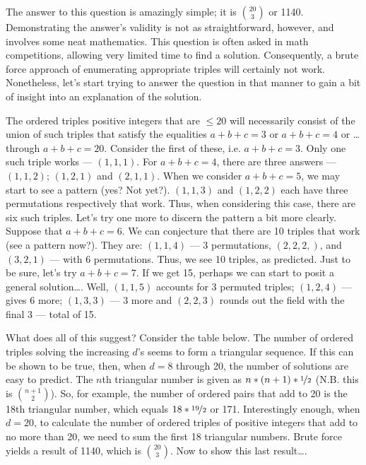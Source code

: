 
{}

The answer to this question is amazingly simple; it is \(\binom{20}{3}\) or 1140. Demonstrating the answer’s validity is not as straightforward, however, and involves some neat mathematics. This question is often asked in math competitions, allowing very limited time to find a solution. Consequently, a brute force approach of enumerating appropriate triples will certainly not work. Nonetheless, let’s start trying to answer the question in that manner to gain a bit of insight into an explanation of the solution.

The ordered triples positive integers that are \(\leq 20\) will necessarily consist of the union of such triples that satisfy the equalities \(a + b + c = 3\) or \(a + b + c = 4\) or \ldots through \(a + b + c = 20\). Consider the first of these, i.e. \(a + b + c = 3\). Only one such triple works --- \((1,1,1)\).  For \(a + b + c = 4\), there are three answers --- \((1,1,2)\); \((1,2,1)\) and \((2,1,1)\). When we consider \(a + b + c = 5\), we may start to see a pattern (yes? Not yet?). \((1,1,3)\) and \((1,2,2)\) each have three permutations respectively that work. Thus, when considering this case, there are six such triples. Let’s try one more to discern the pattern a bit more clearly. Suppose that \(a + b + c = 6\). We can conjecture that there are 10 triples that work (see a pattern now?). They are: \((1,1,4)\) --- 3 permutations, \((2,2,2,)\), and \((3,2,1)\) --- with 6 permutations. Thus, we see 10 triples, as predicted. Just to be sure, let’s try \(a + b + c = 7\). If we get 15, perhaps we can start to posit a general solution\ldots. Well, \((1,1,5)\) accounts for 3 permuted triples; \((1,2,4)\) --- gives 6 more; \((1,3,3)\) --- 3 more and \((2,2,3)\) rounds out the field with the final 3 --- total of 15.

What does all of this suggest? Consider the table below. The number of ordered triples solving the increasing \(d\)’s seems to form a triangular sequence. If this can be shown to be true, then, when \(d = 8\) through 20, the number of solutions are easy to predict. The \(n\)th triangular number is given as \(n * (n+1) * \nicefrac{1}{2}\) (N.B. this is \(\binom{n+1}{2}\)). So, for example, the number of ordered pairs that add to 20 is the 18th triangular number, which equals \(18 * \nicefrac{19}{2}\) or 171. Interestingly enough, when \(d = 20\), to calculate the number of ordered triples of positive integers that add to no more than 20, we need to sum the first 18 triangular numbers. Brute force yields a result of 1140, which is \(\binom{20}{3}\). Now to show this last result\ldots.

